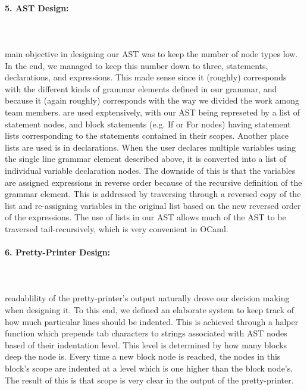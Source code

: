 \documentclass{article}
\begin{document}
\paragraph{5. AST Design:}\mbox{}\\\\
 main objective in designing our AST was to keep the number of node types low. In the end, we managed to keep this number down to three, statements, declarations, and expressions. This made sense since it (roughly) corresponds with the different kinds of grammar elements defined in our grammar, and because it (again roughly) corresponds with the way we divided the work among team members.
 are used exptensively, with our AST being represeted by a list of statement nodes, and block statements (e.g. If or For nodes) having statement lists corresponding to the statements contained in their scopes. Another place lists are used is in declarations. When the user declares multiple variables using the single line grammar element described above, it is converted into a list of individual variable declaration nodes. The downside of this is that the variables are assigned expressions in reverse order because of the recursive definition of the grammar element. This is addressed by traversing through a reversed copy of the list and re-assigning variables in the original list based on the new reversed order of the expressions. The use of lists in our AST allows much of the AST to be traversed tail-recursively, which is very convenient in OCaml.
\paragraph{6. Pretty-Printer Design:}\mbox{}\\\\
 readablility of the pretty-printer's output naturally drove our decision making when designing it. To this end, we defined an elaborate system to keep track of how much particular lines should be indented. This is achieved through a halper function which prepends tab characters to strings associated with AST nodes based of their indentation level. This level is determined by how many blocks deep the node is. Every time a new block node is reached, the nodes in this block's scope are indented at a level which is one higher than the block node's. The result of this is that scope is very clear in the output of the pretty-printer.
\end{document}
